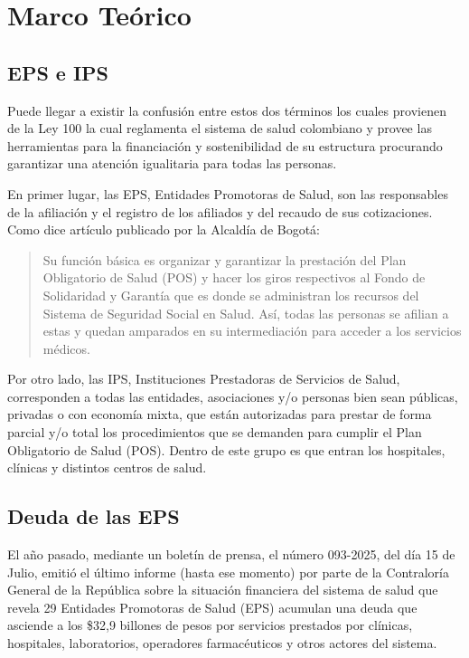 \section{Marco Teórico}

\subsection{EPS e IPS}

Puede llegar a existir la confusión entre estos dos términos los cuales provienen de la Ley 100 la cual reglamenta el sistema de salud colombiano y provee las herramientas para la financiación y sostenibilidad de su estructura procurando garantizar una atención igualitaria para todas las personas.

En primer lugar, las EPS, Entidades Promotoras de Salud, son las responsables de la afiliación y el registro de los afiliados y del recaudo de sus cotizaciones. Como dice artículo publicado por la Alcaldía de Bogotá:

\begin{quote}
	Su función básica es organizar y garantizar la prestación del Plan Obligatorio de Salud (POS) y hacer los giros respectivos al Fondo de Solidaridad y Garantía que es donde se administran los recursos del Sistema de Seguridad Social en Salud. Así, todas las personas se afilian a estas y quedan amparados en su intermediación para acceder a los servicios médicos. \cite{arias2021}
\end{quote}

Por otro lado, las IPS, Instituciones Prestadoras de Servicios de Salud, corresponden a todas las entidades, asociaciones y/o personas bien sean públicas, privadas o con economía mixta, que están autorizadas para prestar de forma parcial y/o total los procedimientos que se demanden para cumplir el Plan Obligatorio de Salud (POS). Dentro de este grupo es que entran los hospitales, clínicas y distintos centros de salud.

\subsection{Deuda de las EPS}

El año pasado, mediante un boletín de prensa, el número 093-2025, del día 15 de Julio, emitió el último informe (hasta ese momento) por parte de la Contraloría General de la República sobre la situación financiera del sistema de salud que revela 29 Entidades Promotoras de Salud (EPS) acumulan una deuda que asciende a los \$32,9 billones de pesos por servicios prestados por clínicas, hospitales, laboratorios, operadores farmacéuticos y otros actores del sistema.

